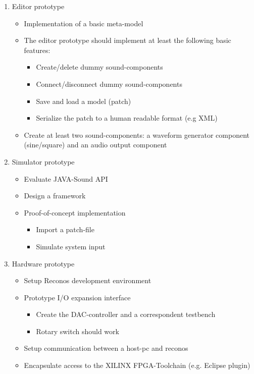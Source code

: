 \begin{enumerate}
	\item Editor prototype
		\begin{itemize}
			\item Implementation of a basic meta-model
			\item The editor prototype should implement at least the following basic features:
				\begin{itemize}
					\item Create/delete dummy sound-components
					\item Connect/disconnect dummy sound-components
					\item Save and load a model (patch)
					\item Serialize the patch to a human readable format (e.g \ac{XML})
				\end{itemize}
			\item Create at least two sound-components: a waveform generator component (sine/square) and an audio output component
		\end{itemize}
	\item Simulator prototype
		\begin{itemize}
			\item Evaluate JAVA-Sound API
			\item Design a framework
			\item Proof-of-concept implementation
			\begin{itemize}
				\item Import a patch-file
				\item Simulate system input
			\end{itemize}
		\end{itemize}
	\item Hardware prototype
		\begin{itemize}
			\item Setup Reconos development environment
			\item Prototype I/O expansion interface
			\begin{itemize}
				\item Create the DAC-controller and a correspondent testbench
				\item Rotary switch should work
			\end{itemize}
			\item Setup communication between a host-pc and reconos
			\item Encapsulate access to the XILINX \ac{FPGA}-Toolchain (e.g. Eclipse plugin)
		\end{itemize}
\end{enumerate}


